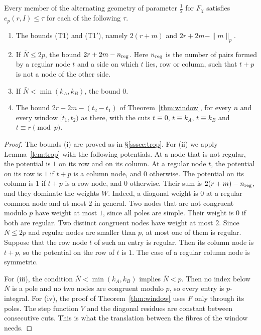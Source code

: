\begin{proposition}\label{prop:chi3-local}
Every member of the alternating geometry of parameter $\frac12$ for $F_\chi$ satisfies $e_p(r,I)\le\tau$ for each of the
following $\tau$.
\begin{enumerate}[label=(\roman*),leftmargin=*]
\item The bounds (T1) and (T1$'$), namely $2(r+m)$ and $2r+2m-\|m\|_p$.
\item If $\bar N\le2p$, the bound $2r+2m-n_{\rm reg}$. Here $n_{\rm reg}$ is the number of pairs formed by a regular node $t$
 and a side on which $t$ lies, row or column, such that $t+p$ is not a node of the other side.
\item If $\bar N<\min(k_A,k_B)$, the bound $0$.
\item The bound $2r+2m-(t_2-t_1)$ of Theorem~\ref{thm:window}, for every $n$ and every window $[t_1,t_2)$ as there, with
 the cuts $t\equiv0$, $t\equiv k_A$, $t\equiv k_B$ and $t\equiv r\pmod p$.
\end{enumerate}
\end{proposition}

\begin{proof}
The bounds (i) are proved as in \S\ref{sssec:trop}. For (ii) we apply Lemma~\ref{lem:trop} with the following potentials.
At a node that is not regular, the potential is $1$ on its row and on its column. At a regular node $t$, the potential on
its row is $1$ if $t+p$ is a column node, and $0$ otherwise. The potential on its column is $1$ if $t+p$ is a row node,
and $0$ otherwise. Their sum is $2(r+m)-n_{\rm reg}$, and they dominate the weights $W$. Indeed, a diagonal weight is $0$
at a regular common node and at most $2$ in general. Two nodes that are not congruent modulo $p$ have weight at most $1$,
since all poles are simple. Their weight is $0$ if both are regular. Two distinct congruent nodes have weight at most
$2$. Since $\bar N\le2p$ and regular nodes are smaller than $p$, at most one of them is regular. Suppose that the row node $t$
of such an entry is regular. Then its column node is $t+p$, so the potential on the row of $t$ is $1$. The case of a
regular column node is symmetric.

For (iii), the condition $\bar N<\min(k_A,k_B)$ implies $\bar N<p$. Then no index below $\bar N$ is a pole and no two nodes are
congruent modulo $p$, so every entry is $p$-integral. For (iv), the proof of Theorem~\ref{thm:window} uses $F$ only
through its poles. The step function $V$ and the diagonal residues are constant between consecutive cuts. This is what
the translation between the fibres of the window needs.
\end{proof}

